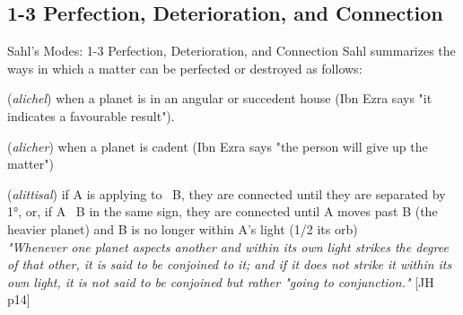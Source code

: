 \subsection{1-3 Perfection, Deterioration, and Connection}
\begin{frame}[t]{Sahl's Modes: 1-3 Perfection, Deterioration, and Connection}
Sahl summarizes the ways in which a matter can be perfected or destroyed as follows:\footnotemark[1]

\begin{description}[style=nextline]
\item[1. Perfection or Advance] (\textsl{alichel}) when a planet is in an angular or succedent house (Ibn Ezra says "it indicates a favourable result").

\item[2. Deterioration or Retreat] (\textsl{alicher}) when a planet is cadent (Ibn Ezra says "the person will give up the matter")

\item[3. Conjunction or Connection] (\textsl{alittisal}) if A is applying to \Conjunction\ B, they are connected until they are separated by 1°, or, if A \Conjunction\ B in the same sign, they are connected until A moves past B (the heavier planet) and B is no longer within A's light (1/2 its orb) \\
\vspace{1em}
\textsl{"Whenever one planet aspects another and within its own light strikes the degree of that other, it is said to be conjoined to it; and if it does not strike it within its own light, it is not said to be conjoined but rather "going to conjunction."} [JH p14]\\

\end{description}

\end{frame}
